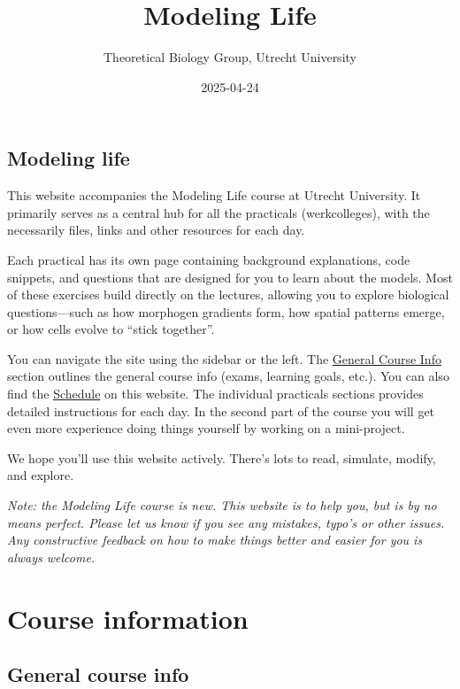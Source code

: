 \documentclass[
  letterpaper,
  DIV=11,
  numbers=noendperiod]{scrreprt}
\title{Modeling Life}
\author{Theoretical Biology Group, Utrecht University}
\date{2025-04-24}
\renewcommand*\contentsname{Table of contents}
\newcommand\contentsname{Table of contents}
\theoremstyle{definition}
\theoremstyle{remark}
\begin{document}
\maketitle

\renewcommand*\contentsname{Table of contents}
{
\hypersetup{linkcolor=}
\setcounter{tocdepth}{2}
\tableofcontents
}

\chapter*{Modeling life}\label{modeling}


This website accompanies the Modeling Life course at Utrecht University.
It primarily serves as a central hub for all the practicals
(werkcolleges), with the necessarily files, links and other resources
for each day.

Each practical has its own page containing background explanations, code
snippets, and questions that are designed for you to learn about the
models. Most of these exercises build directly on the lectures, allowing
you to explore biological questions---such as how morphogen gradients
form, how spatial patterns emerge, or how cells evolve to ``stick
together''.

You can navigate the site using the sidebar or the left. The
\href{general.qmd}{General Course Info} section outlines the general
course info (exams, learning goals, etc.). You can also find the
\href{schedule.qmd}{Schedule} on this website. The individual practicals
sections provides detailed instructions for each day. In the second part
of the course you will get even more experience doing things yourself by
working on a mini-project.

We hope you'll use this website actively. There's lots to read,
simulate, modify, and explore.

\emph{Note: the Modeling Life course is new. This website is to help
you, but is by no means perfect. Please let us know if you see any
mistakes, typo's or other issues. Any constructive feedback on how to
make things better and easier for you is always welcome.}

\part{Course information}

\chapter{General course info}\label{general}
\end{document}
